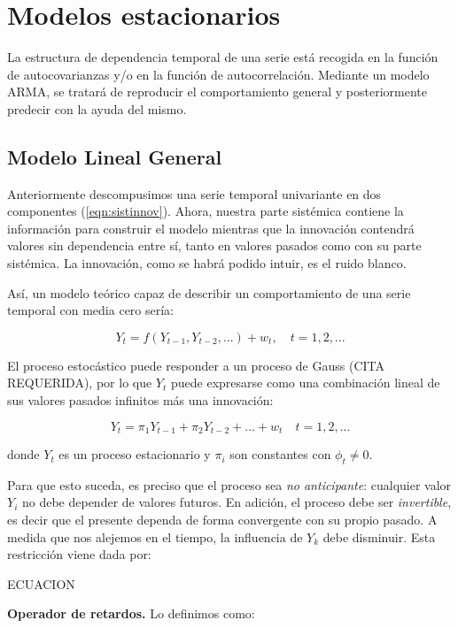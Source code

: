 \documentclass[a4paper,10pt]{article}
\begin{document}
\section{Modelos estacionarios}

La estructura de dependencia temporal de una serie está recogida en la función de autocovarianzas y/o en la función de autocorrelación. Mediante un modelo ARMA, se tratará de reproducir el comportamiento general y posteriormente predecir con la ayuda del mismo.

\subsection{Modelo Lineal General}

Anteriormente descompusimos una serie temporal univariante en dos componentes (\ref{eqn:sistinnov}). Ahora, nuestra parte sistémica contiene la información para construir el modelo mientras que la innovación contendrá valores sin dependencia entre sí, tanto en valores pasados como con su parte sistémica. La innovación, como se habrá podido intuir, es el ruido blanco.

Así, un modelo teórico capaz de describir un comportamiento de una serie temporal con media cero sería:

\begin{equation}
Y_t = f(Y_{t-1},Y_{t-2},...) + w_t, \quad t=1,2,...
\end{equation}

El proceso estocástico puede responder a un proceso de Gauss (CITA REQUERIDA), por lo que $Y_t$ puede expresarse como una combinación lineal de sus valores pasados infinitos más una innovación:

\begin{equation}\label{eqn:ar}
Y_t = \pi_1 Y_{t-1} + \pi_2 Y_{t-2} + ... + w_t \quad t=1,2,...
\end{equation}

donde $Y_t$ es un proceso estacionario y $\pi_i$ son constantes con $\phi_t \neq 0$.

Para que esto suceda, es preciso que el proceso sea \textit{no anticipante}: cualquier valor $Y_i$ no debe depender de valores futuros. En adición, el proceso debe ser \textit{invertible}, es decir que el presente dependa de forma convergente con su propio pasado. A medida que nos alejemos en el tiempo, la influencia de $Y_k$ debe disminuir. Esta restricción viene dada por:

ECUACION

\textbf{Operador de retardos.} Lo definimos como:
\end{document}
